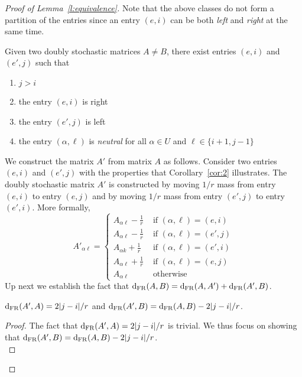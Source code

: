 \begin{proof}[Proof of Lemma~\ref{l:equivalence}]
\noindent Note that the above classes do not form a partition of the entries since an entry $(e,i)$ can be both \textit{left} and \textit{right} at the same time.    

\begin{corollary}\label{cor:2}
    Given two doubly stochastic matrices $A \neq B$, there exist entries $(e,i)$ and $(e',j)$ such that
    \begin{enumerate}
        \item $j > i$
        \item the entry $(e,i)$ is right
        \item the entry $(e',j)$ is left
        \item the entry $(\alpha,\ell)$ is \textit{neutral} for all $\alpha \in U$ and $\ell \in \{i+1,j-1\}$
    \end{enumerate}
    \end{corollary}
    
    We construct the matrix $A'$ from matrix $A$ as follows. Consider two entries $(e,i)$ and $(e',j)$ with the properties that Corollary~\ref{cor:2} illustrates. The doubly stochastic matrix $A'$ is constructed by moving $1/r$ mass from entry $(e,i)$ to entry $(e,j)$ and by moving $1/r$ mass from entry $(e',j)$ to entry $(e',i)$. More formally,
    \begin{equation*}
        A'_{\alpha \ell} = 
        \begin{cases} 
            A_{\alpha \ell} - \frac{1}{r} & \text{ if } (\alpha,\ell)=(e,i) \\
            A_{\alpha \ell} - \frac{1}{r} & \text{ if } (\alpha,\ell)=(e',j)\\
            A_{\alpha k} + \frac{1}{r} & \text{ if } (\alpha,\ell)=(e',i) \\
            A_{\alpha \ell} + \frac{1}{r} & \text{ if } (\alpha,\ell)=(e,j)\\
            A_{\alpha \ell} & \text{ otherwise }
        \end{cases}
    \end{equation*}
\noindent Up next we establish the fact that $\mathrm{d}_{\mathrm{FR}}(A,B) = \mathrm{d}_{\mathrm{FR}}(A,A') + \mathrm{d}_{\mathrm{FR}}(A',B)$.
\begin{claim}
$\mathrm{d}_{\mathrm{FR}}(A',A) = 2|j-i|/r$ and 
$\mathrm{d}_{\mathrm{FR}}(A',B) = \mathrm{d}_{\mathrm{FR}}(A,B) - 2|j-i|/r$.    
\end{claim}
\begin{proof}
The fact that $\mathrm{d}_{\mathrm{FR}}(A',A) = 2|j-i|/r$ is trivial. We thus focus on showing that 
$\mathrm{d}_{\mathrm{FR}}(A',B) = \mathrm{d}_{\mathrm{FR}}(A,B) - 2|j-i|/r$.\\


\end{proof}
\end{proof}
